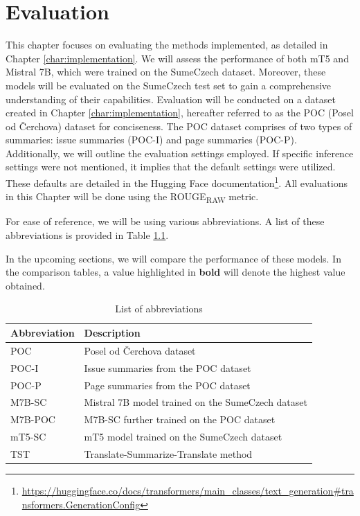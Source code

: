 \documentclass[english, ba, kiv, he, iso690numb, pdf, viewonly]{fasthesis}
\begin{document}
\chapter{Evaluation}\label{ch:eval}
This chapter focuses on evaluating the methods implemented, as detailed in Chapter \ref{char:implementation}. We will assess the performance of both mT5 and Mistral 7B, which were trained on the SumeCzech dataset. Moreover, these models will be evaluated on the SumeCzech test set to gain a comprehensive understanding of their capabilities. Evaluation will be conducted on a dataset created in Chapter \ref{char:implementation}, hereafter referred to as the POC (Posel od Čerchova) dataset for conciseness. The POC dataset comprises of two types of summaries: issue summaries (POC-I) and page summaries (POC-P). Additionally, we will outline the evaluation settings employed. If specific inference settings were not mentioned, it implies that the default settings were utilized. These defaults are detailed in the Hugging Face documentation\footnote{\url{https://huggingface.co/docs/transformers/main_classes/text_generation\#transformers.GenerationConfig}}. All evaluations in this Chapter will be done using the ROUGE\textsubscript{RAW} metric.

For ease of reference, we will be using various abbreviations. A list of these abbreviations is provided in Table \ref{tab:abbreviations}.

In the upcoming sections, we will compare the performance of these models. In the comparison tables, a value highlighted in \textbf{bold} will denote the highest value obtained.

\begin{table}[ht]
\centering
\caption{List of abbreviations}
\label{tab:abbreviations}
\begin{tabular}{ll}
\hline
\textbf{Abbreviation} & \textbf{Description}                                             \\ \hline
POC                   & Posel od Čerchova dataset                                        \\
POC-I                 & Issue summaries from the POC dataset                             \\
POC-P                 & Page summaries from the POC dataset                              \\
M7B-SC                & Mistral 7B model trained on the SumeCzech dataset                 \\
M7B-POC               & M7B-SC further trained on the POC dataset               \\
mT5-SC                & mT5 model trained on the SumeCzech dataset                        \\
TST                   & Translate-Summarize-Translate method                           \\ \hline
\end{tabular}
\end{table}
\end{document}
